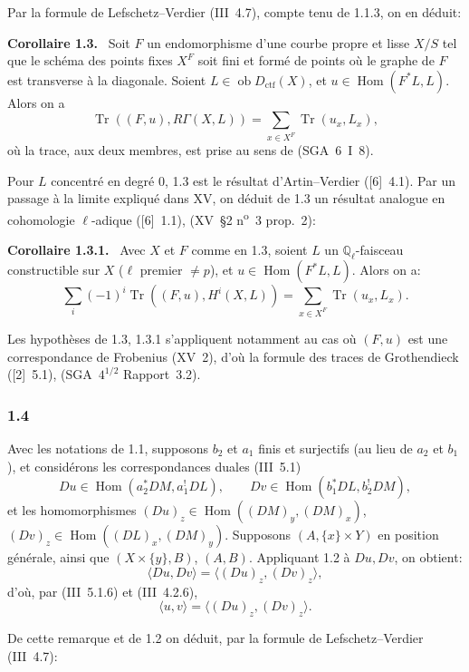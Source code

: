 \documentclass[11pt]{article}
\newenvironment{statement}[1]{\par\medskip\noindent\textbf{#1.}\ }{\par\medskip}
\DeclareMathOperator{\Hom}{Hom}
\newcommand{\ob}{\operatorname{ob}}
\providecommand{\ctf}{\mathrm{ctf}}
\providecommand{\Tr}{\operatorname{Tr}}
\providecommand{\Tr}{\operatorname{Tr}}
\providecommand{\Tr}{\operatorname{Tr}}
\providecommand{\Hom}{\operatorname{Hom}}
\providecommand{\ob}{\operatorname{ob}}
\providecommand{\Tr}{\operatorname{Tr}}
\providecommand{\Hom}{\operatorname{Hom}}
\providecommand{\Tr}{\operatorname{Tr}}
\begin{document}
Par la formule de Lefschetz--Verdier (III~4.7), compte tenu de 1.1.3, on en déduit:

\begin{statement}{Corollaire 1.3}
Soit $F$ un endomorphisme d'une courbe propre et lisse $X/S$ tel que le schéma des points fixes $X^F$ soit fini et formé de points où le graphe de $F$ est transverse à la diagonale. Soient $L\in\ob D_{\ctf}(X)$, et $u\in\Hom(F^*L,L)$. Alors on a
\[
\Tr((F,u),R\Gamma(X,L))=\sum_{x\in X^F}\Tr(u_x,L_x),
\]
où la trace, aux deux membres, est prise au sens de (SGA~6~I~8).
\end{statement}

Pour $L$ concentré en degré $0$, 1.3 est le résultat d'Artin--Verdier ([6]~4.1). Par un passage à la limite expliqué dans XV, on déduit de 1.3 un résultat analogue en cohomologie $\ell$-adique ([6]~1.1), (XV~\S2 n\textsuperscript{o}~3 prop.~2):

\begin{statement}{Corollaire 1.3.1}
Avec $X$ et $F$ comme en 1.3, soient $L$ un $\mathbb Q_\ell$-faisceau constructible sur $X$ ($\ell$ premier $\ne p$), et $u\in\Hom(F^*L,L)$. Alors on a:
\[
\sum_i(-1)^i\Tr((F,u),H^i(X,L))=\sum_{x\in X^F}\Tr(u_x,L_x).
\]
\end{statement}

Les hypothèses de 1.3, 1.3.1 s'appliquent notamment au cas où $(F,u)$ est une correspondance de Frobenius (XV~2), d'où la formule des traces de Grothendieck ([2]~5.1), (SGA~$4^{1/2}$ Rapport~3.2).

\subsubsection*{1.4}
Avec les notations de 1.1, supposons $b_2$ et $a_1$ finis et surjectifs (au lieu de $a_2$ et $b_1$), et considérons les correspondances duales (III~5.1)
\[
Du\in\Hom(a_2^*DM,a_1^!DL),\qquad Dv\in\Hom(b_1^*DL,b_2^!DM),
\]
et les homomorphismes $(Du)_z\in\Hom((DM)_y,(DM)_x)$, $(Dv)_z\in\Hom((DL)_x,(DM)_y)$. Supposons $(A,\{x\}\times Y)$ en position générale, ainsi que $(X\times\{y\},B)$, $(A,B)$. Appliquant 1.2 à $Du,Dv$, on obtient:
\[
\langle Du,Dv\rangle=\langle (Du)_z,(Dv)_z\rangle,
\]
d'où, par (III~5.1.6) et (III~4.2.6),
\begin{equation}\tag{1.4.1}
\langle u,v\rangle=\langle (Du)_z,(Dv)_z\rangle.
\end{equation}

De cette remarque et de 1.2 on déduit, par la formule de Lefschetz--Verdier (III~4.7):
\end{document}
